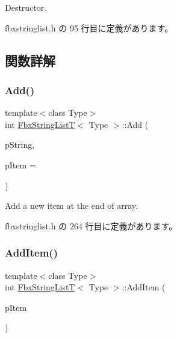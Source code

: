 Destructor. 



 fbxstringlist.\+h の 95 行目に定義があります。



\subsection{関数詳解}
\mbox{\label{class_fbx_string_list_t_ace48eedb25e7393d546c914924355cd2}} 
\subsubsection{\texorpdfstring{Add()}{Add()}}
{\footnotesize\ttfamily template$<$class Type$>$ \\
int \hyperlink{class_fbx_string_list_t}{Fbx\+String\+ListT}$<$ Type $>$\+::Add (\begin{DoxyParamCaption}\item[{const char $\ast$}]{p\+String,  }\item[{Fbx\+Handle}]{p\+Item = {} }\end{DoxyParamCaption})\hspace{0.3cm}{\ttfamily [inline]}}



Add a new item at the end of array. 



 fbxstringlist.\+h の 264 行目に定義があります。

\mbox{\label{class_fbx_string_list_t_aa8dfd9f7ca27dafca1f2c80aa8590a19}} 
\subsubsection{\texorpdfstring{Add\+Item()}{AddItem()}}
{\footnotesize\ttfamily template$<$class Type$>$ \\
int \hyperlink{class_fbx_string_list_t}{Fbx\+String\+ListT}$<$ Type $>$\+::Add\+Item (\begin{DoxyParamCaption}\item[{Type $\ast$}]{p\+Item }\end{DoxyParamCaption})\hspace{0.3cm}{\ttfamily [inline]}}

